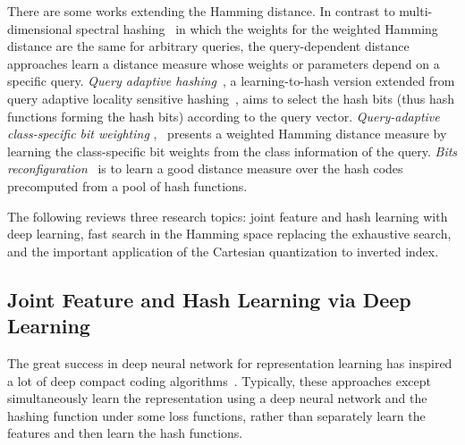 \documentclass[10pt,journal,compsoc]{IEEEtran}
\begin{document}
There are some works extending the Hamming distance.
In contrast to multi-dimensional spectral hashing~\cite{WeissFT12}
in which the weights for the weighted Hamming distance
are the same for arbitrary queries,
the query-dependent distance approaches
learn a distance measure
whose weights or parameters depend on
a specific query.
\emph{Query adaptive hashing}~\cite{LiuYJHZ13},
a learning-to-hash version extended
from query adaptive locality sensitive hashing~\cite{JegouASG08},
aims to select the hash bits (thus hash functions forming the hash bits)
according to the query vector.
\emph{Query-adaptive class-specific bit weighting}
\cite{JiangWC11},~\cite{JiangWXC13} presents a weighted Hamming distance measure
by learning the class-specific bit weights
from the class information of the query.
\emph{Bits reconfiguration}~\cite{MuCLCY12}
is to learn a good distance measure
over the hash codes precomputed
from a pool of hash functions.


The following reviews three research topics:
joint feature and hash learning with deep learning,
fast search in the Hamming space
replacing the exhaustive search,
and the important application of the Cartesian quantization
to inverted index.

\subsection{Joint Feature and Hash Learning via Deep Learning}
The great success in deep neural network for representation learning
has inspired a lot of deep compact coding algorithms~\cite{XiaPLLY14,LaiPLY15,GaoSZZS15, ZhaoHWT15}.
Typically,
these approaches except~\cite{LaiPLY15}
simultaneously learn the representation
using a deep neural network
and the hashing function under some loss functions,
rather than separately learn the features and then learn the hash functions.
\end{document}
